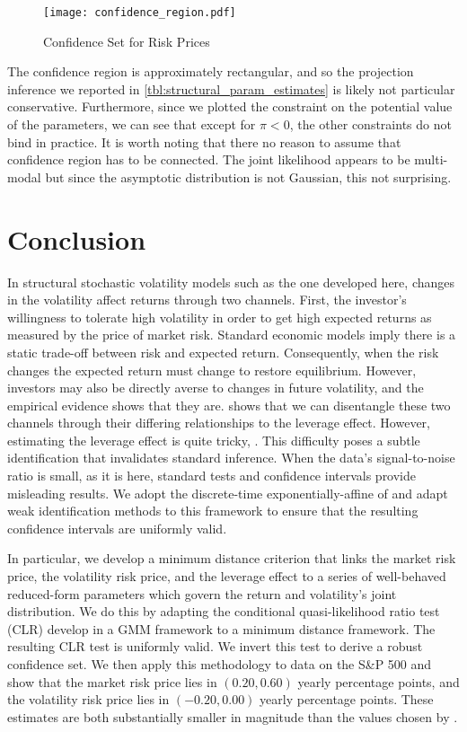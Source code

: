 \documentclass[11pt, letterpaper, twoside]{article}
\begin{document}
\begin{figure}[htb]

  \centering
  \caption{Confidence Set for Risk Prices}
  \label{fig:confidence_region}

  \texttt{[image: confidence\_region.pdf]}
\end{figure}

The confidence region is approximately rectangular, and so the projection inference we reported in \cref{tbl:structural_param_estimates} is likely not particular conservative. Furthermore, since we plotted the constraint on the potential value of the parameters, we can see that except for $\pi < 0$, the other constraints do not bind in practice. It is worth noting that there no reason to assume that confidence region has to be connected. The joint likelihood appears to be multi-modal but since the asymptotic distribution is not Gaussian, this not surprising.


\section{Conclusion}

In structural stochastic volatility models such as the one developed here, changes in the volatility affect returns through two channels. First, the investor's willingness to tolerate high volatility in order to get high expected returns as measured by the price of market risk. Standard economic models imply there is a static trade-off between risk and expected return. Consequently, when the risk changes the expected return must change to restore equilibrium. However, investors may also be directly averse to changes in future volatility, and the empirical evidence shows that they are. \Textcite{han2018leverage} shows that we can disentangle these two channels through their differing relationships to the leverage effect. However, estimating the leverage effect is quite tricky, \parencite{aitsahalia2013leverage}. This difficulty poses a subtle identification that invalidates standard inference. When the data's signal-to-noise ratio is small, as it is here, standard tests and confidence intervals provide misleading results. We adopt the discrete-time exponentially-affine of \textcite{han2018leverage} and adapt weak identification methods to this framework to ensure that the resulting confidence intervals are uniformly valid.

In particular, we develop a minimum distance criterion that links the market risk price, the volatility risk price, and the leverage effect to a series of well-behaved reduced-form parameters which govern the return and volatility's joint distribution. We do this by adapting the conditional quasi-likelihood ratio test (CLR) \textcite{andrews2016conditional} develop in a GMM framework to a minimum distance framework. The resulting CLR test is uniformly valid. We invert this test to derive a robust confidence set. We then apply this methodology to data on the S\&P 500 and show that the market risk price lies in $(0.20, 0.60)$ yearly percentage points, and the volatility risk price lies in $(-0.20, 0.00)$ yearly percentage points. These estimates are both substantially smaller in magnitude than the values chosen by \textcite{han2018leverage}.
\end{document}
